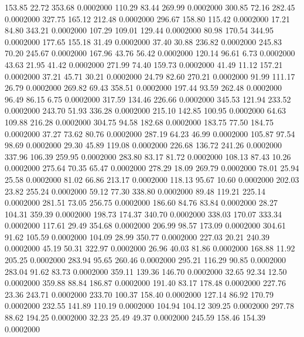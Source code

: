  153.85   22.72  353.68   0.0002000
 110.29   83.44  269.99   0.0002000
 300.85   72.16  282.45   0.0002000
 327.75  165.12  212.48   0.0002000
 296.67  158.80  115.42   0.0002000
  17.21   84.80  343.21   0.0002000
 107.29  109.01  129.44   0.0002000
  80.98  170.54  344.95   0.0002000
 177.65  155.18   31.49   0.0002000
  37.40   30.88  236.82   0.0002000
 245.83   70.20  245.67   0.0002000
 167.96   43.76   56.42   0.0002000
 120.14   96.61    6.73   0.0002000
  43.63   21.95   41.42   0.0002000
 271.99   74.40  159.73   0.0002000
  41.49   11.12  157.21   0.0002000
  37.21   45.71   30.21   0.0002000
  24.79   82.60  270.21   0.0002000
  91.99  111.17   26.79   0.0002000
 269.82   69.43  358.51   0.0002000
 197.44   93.59  262.48   0.0002000
  96.49   86.15    6.75   0.0002000
 317.59  134.46  226.66   0.0002000
 345.53  121.94  233.52   0.0002000
 243.70   51.93  336.28   0.0002000
 215.10  142.85  100.95   0.0002000
  64.63  109.88  216.28   0.0002000
 304.75   94.58  182.68   0.0002000
 183.75   77.50  184.75   0.0002000
  37.27   73.62   80.76   0.0002000
 287.19   64.23   46.99   0.0002000
 105.87   97.54   98.69   0.0002000
  29.30   45.89  119.08   0.0002000
 226.68  136.72  241.26   0.0002000
 337.96  106.39  259.95   0.0002000
 283.80   83.17   81.72   0.0002000
 108.13   87.43   10.26   0.0002000
 275.64   70.35   65.47   0.0002000
 278.29   18.09  269.79   0.0002000
  78.01   25.94   25.58   0.0002000
  81.02   66.86  213.17   0.0002000
 118.13   95.67   10.60   0.0002000
 202.03   23.82  255.24   0.0002000
  59.12   77.30  338.80   0.0002000
  89.48  119.21  225.14   0.0002000
 281.51   73.05  256.75   0.0002000
 186.60   84.76   83.84   0.0002000
  28.27  104.31  359.39   0.0002000
 198.73  174.37  340.70   0.0002000
 338.03  170.07  333.34   0.0002000
 117.61   29.49  354.68   0.0002000
 206.99   98.57  173.09   0.0002000
 304.61   91.62  105.59   0.0002000
 104.09   28.99  350.77   0.0002000
 227.03   20.21  240.39   0.0002000
  45.19   50.31  322.97   0.0002000
  26.96   40.03   81.86   0.0002000
 168.88   11.92  205.25   0.0002000
 283.94   95.65  260.46   0.0002000
 295.21  116.29   90.85   0.0002000
 283.04   91.62   83.73   0.0002000
 359.11  139.36  146.70   0.0002000
  32.65   92.34   12.50   0.0002000
 359.88   88.84  186.87   0.0002000
 191.40   83.17  178.48   0.0002000
 227.76   23.36  243.71   0.0002000
 233.70  100.37  158.40   0.0002000
 127.14   86.92  170.79   0.0002000
 232.55  141.89  110.19   0.0002000
 104.94  104.12  309.25   0.0002000
 297.78   88.62  194.25   0.0002000
  32.23   25.49   49.37   0.0002000
 245.59  158.46  154.39   0.0002000

